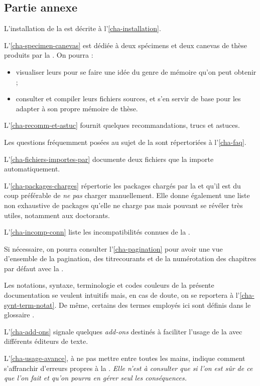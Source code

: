 \subsection{Partie annexe}
\label{sec-partie-annexe}

L'installation de la \yatcl{} est décrite à l'\vref{cha-installation}.

L'\vref{cha-specimen-canevas} est dédiée à deux spécimens et deux canevas de
thèse produits par la \yatcl{}. On pourra :
\begin{itemize}
\item visualiser leurs  pour se faire une idée du genre de
  mémoire qu'on peut obtenir ;
\item consulter et compiler leurs fichiers sources, et s'en servir de base pour
  les adapter à son propre mémoire de thèse.
\end{itemize}

L'\vref{cha-recomm-et-astuc} fournit quelques recommandations, trucs et astuces.

Les questions fréquemment posées au sujet de la \yatcl{} sont répertoriées
à l'\vref{cha-faq}.

L'\vref{cha-fichiers-importes-par} documente deux fichiers que la \yatcl{}
importe automatiquement.

L'\vref{cha-packages-charges} répertorie les packages chargés par la \yatcl{} et
qu'il est du coup préférable de \emph{ne pas} charger manuellement. Elle donne
également une liste non exhaustive de packages qu'elle ne charge pas mais
pouvant se révéler très utiles, notamment aux doctorants.

L'\vref{cha-incomp-conn} liste les incompatibilités connues de la \yatcl{}.

Si nécessaire, on pourra consulter l'\vref{cha-pagination} pour avoir une vue
d'ensemble de la \gls{pagination}, des \glspl{titrecourant} et de la
numérotation des chapitres par défaut avec la \yatcl{}.

Les notations, syntaxe, terminologie et codes couleurs de la présente
documentation se veulent intuitifs mais, en cas de doute, on se reportera
à l'\vref{cha-synt-term-notat}. De même, certains des termes employés ici sont
définis dans le glossaire .

L'\vref{cha-add-ons} signale quelques \emph{add-ons} destinés à faciliter
l'usage de la \yatcl{} avec différents éditeurs de texte.

L'\vref{cha-usage-avance}, à ne pas mettre entre toutes les mains, indique
comment s'affranchir d'erreurs propres à la \yatcl{}. \emph{Elle n'est
  à consulter que si l'on est sûr de ce que l'on fait et qu'on pourra en gérer
  \emph{seul} les conséquences.}

